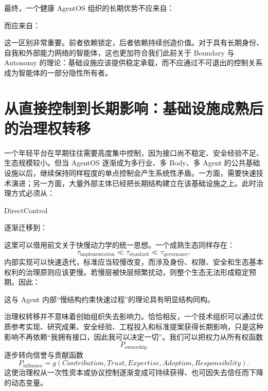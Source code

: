 最终，一个健康 AgentOS 组织的长期优势不应来自：
\begin{statementbox}
\centering
{}
\end{statementbox}
而应来自：
\begin{statementbox}
\centering
{}
\end{statementbox}
这一区别非常重要。前者依赖锁定，后者依赖持续创造价值。对于具有长期身份、自我和外部能力网络的智能体，这也更加符合我们此前关于 Boundary 与 Autonomy 的理论：基础设施应该提供稳定承载，而不应通过不可退出的控制关系成为智能体的一部分隐性所有者。

\section{从直接控制到长期影响：基础设施成熟后的治理权转移}

一个年轻平台在早期往往需要高度集中控制，因为接口尚不稳定、安全经验不足、生态规模较小。但当 AgentOS 逐渐成为多行业、多 Body、多 Agent 的公共基础设施以后，继续保持同样程度的单点控制会产生系统性矛盾。一方面，需要快速技术演进；另一方面，大量外部主体已经把长期结构建立在该基础设施之上。此时治理方式必须从：
\begin{statementbox}
DirectControl
\end{statementbox}
逐渐迁移到：
\begin{statementbox}
\centering
{}
\end{statementbox}

这里可以借用前文关于快慢动力学的统一思想。一个成熟生态同样存在：
\[
\tau_{\mathrm{implementation}}
\ll
\tau_{\mathrm{standard}}
\ll
\tau_{\mathrm{governance}}.
\]
内部实现可以快速迭代，标准应当较慢改变，而涉及身份、权限、安全和生态基本权利的治理原则应该更慢。若慢层被快层频繁扰动，则整个生态无法形成稳定预期。因此：
\begin{statementbox}
\centering
{}
\end{statementbox}
这与 Agent 内部``慢结构约束快速过程''的理论具有明显结构同构。

治理权转移并不意味着创始组织失去影响力。恰恰相反，一个技术组织可以通过优质参考实现、研究成果、安全经验、工程投入和标准提案获得长期影响，只是这种影响不再依赖``我拥有接口，因此我可以决定一切''。我们可以把权力从所有权函数
\[
P_{\mathrm{ownership}}
\]
逐步转向信誉与贡献函数
\[
P_{\mathrm{influence}}
=
g(
Contribution,
Trust,
Expertise,
Adoption,
Responsibility
).
\]
这使治理权从一次性资本或协议控制逐渐变成可持续获得、也可因失去信任而下降的动态变量。

